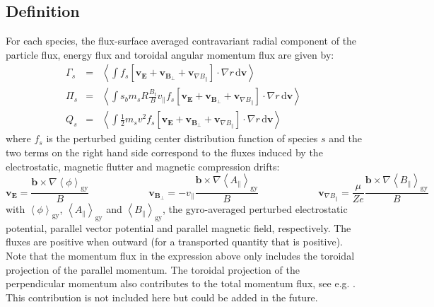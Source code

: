 \documentclass[a4paper]{report}
\begin{document}
\subsection{Definition}
For each species, the flux-surface averaged contravariant radial component of the particle flux, energy flux and toroidal angular momentum flux are given by:
\begin{eqnarray}
 \Gamma_s &=& \left<\int f_s \left[\mathbf{v}_\mathbf{E} + \mathbf{v}_{\mathbf{B}_\perp} + \mathbf{v}_{\nabla B_\parallel}  \right]\cdot \nabla r\,\textrm{d}\mathbf{v}\right> \\
  \Pi_s   &=& \left<\int s_b m_s R \frac{B_t}{B}v_\parallel f_s  \left[\mathbf{v}_\mathbf{E} + \mathbf{v}_{\mathbf{B}_\perp} + \mathbf{v}_{\nabla B_\parallel}  \right] \cdot \nabla r\,\textrm{d}\mathbf{v}\right> \\
      Q_s &=& \left<\int \frac{1}{2}m_sv^2 f_s \left[\mathbf{v}_\mathbf{E} + \mathbf{v}_{\mathbf{B}_\perp} + \mathbf{v}_{\nabla B_\parallel}  \right] \cdot \nabla r\,\textrm{d}\mathbf{v}\right> 
\end{eqnarray}
where $f_s$ is the perturbed guiding center distribution function of species $s$ and the two terms on the right hand side correspond to the fluxes induced by the electrostatic, magnetic flutter and magnetic compression drifts:
\begin{equation}
 \mathbf{v}_\mathbf{E} = \frac{\mathbf{b}\times \nabla \left<\phi\right>_\textrm{gy} }{B} \qquad \qquad \qquad
 \mathbf{v}_{\mathbf{B}_\perp} = -v_\parallel \frac{\mathbf{b}\times \nabla \left<A_{\parallel}\right>_\textrm{gy}}{B}  \qquad \qquad \qquad
 \mathbf{v}_{\nabla B_\parallel} = \frac{\mu}{Ze} \frac{\mathbf{b}\times \nabla \left<B_{\parallel}\right>_\textrm{gy}}{B}
\end{equation}
with $\left<\phi\right>_\textrm{gy}$, $\left<A_{\parallel}\right>_\textrm{gy}$ and $\left<B_{\parallel}\right>_\textrm{gy}$, the gyro-averaged perturbed electrostatic potential, parallel vector potential and parallel magnetic field, respectively. The fluxes are positive when outward (for a transported quantity that is positive).\\
Note that the momentum flux in the expression above only includes the toroidal projection of the parallel momentum. The toroidal projection of the perpendicular momentum also contributes to the total momentum flux, see e.g. \cite{Scott:PoP2010}. This contribution is not included here but could be added in the future. 
\end{document}
